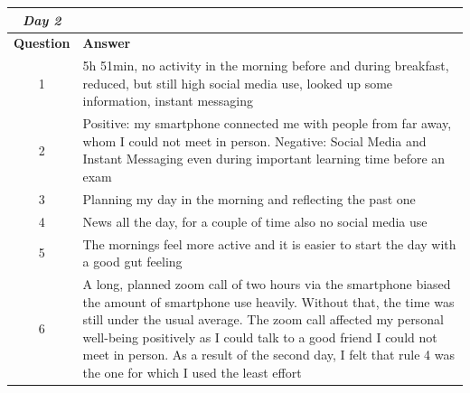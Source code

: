 \documentclass[11pt,a4paper]{article}
\begin{document}
\begin{table}[H]
	\centering
	
\begin{tabularx}{\textwidth}{cb}
\textbf{\textit{Day 2}} &    \\ \midrule[2pt]	
	\textbf{Question}&\textbf{Answer}\\ \toprule[1.3pt]	
	1 & 5h 51min, no activity in the morning before and during breakfast, reduced, but still high social media use, looked up some information, instant messaging \\ \midrule[0.5pt]
	2 & Positive: my smartphone connected me with people from far away, whom I could not meet in person. Negative: Social Media and Instant Messaging even during important learning time before an exam \\ \midrule[0.5pt]
	3 & Planning my day in the morning and reflecting the past one \\ \midrule[0.5pt]
	4 & News all the day, for a couple of time also no social media use \\ \midrule[0.5pt]
	5 & The mornings feel more active and it is easier to start the day with a good gut feeling \\ \midrule[0.5pt]
	6 & A long, planned zoom call of two hours via the smartphone biased the amount of smartphone use heavily. Without that, the time was still under the usual average. The zoom call affected my personal well-being positively as I could talk to a good friend I could not meet in person. As a result of the second day, I felt that rule 4 was the one for which I used the least effort  \\ \bottomrule[1.3pt]
\end{tabularx}

\end{table}
\end{document}
